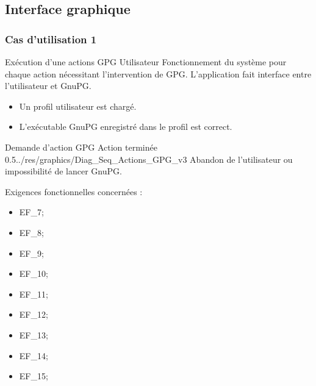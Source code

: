 \documentclass{../res/univ-projet}
\begin{document}
\subsection{Interface graphique}

\subsubsection{Cas d'utilisation 1}
\ficheGraphic
{Exécution d'une actions GPG}
{Utilisateur}
{
  Fonctionnement du système pour chaque action nécessitant l'intervention de GPG. L'application fait interface entre l'utilisateur et GnuPG.
}
{
 \begin{itemize}
  \item Un profil utilisateur est chargé.
  \item L'exécutable GnuPG enregistré dans le profil est correct.
 \end{itemize}

}
{Demande d'action GPG}
{Action terminée}
{0.5}{../res/graphics/Diag_Seq_Actions_GPG_v3}
{Abandon de l'utilisateur ou impossibilité de lancer GnuPG.}
\vspace{0.5cm}

Exigences fonctionnelles concernées :
\begin{itemize}
 \item EF\_7;
 \item EF\_8;
 \item EF\_9;
 \item EF\_10;
 \item EF\_11;
 \item EF\_12;
 \item EF\_13;
 \item EF\_14;
 \item EF\_15;
\end{itemize}
\end{document}

